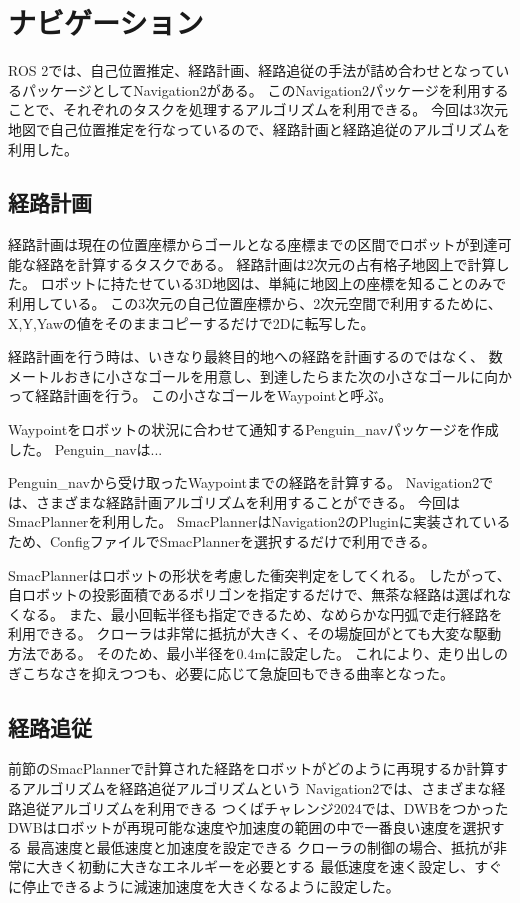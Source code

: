 \section{ナビゲーション}
ROS 2では、自己位置推定、経路計画、経路追従の手法が詰め合わせとなっているパッケージとしてNavigation2\cite{macenski2020marathon2}がある。
このNavigation2パッケージを利用することで、それぞれのタスクを処理するアルゴリズムを利用できる。
今回は3次元地図で自己位置推定を行なっているので、経路計画と経路追従のアルゴリズムを利用した。

\subsection{経路計画}
経路計画は現在の位置座標からゴールとなる座標までの区間でロボットが到達可能な経路を計算するタスクである。
経路計画は2次元の占有格子地図上で計算した。
ロボットに持たせている3D地図は、単純に地図上の座標を知ることのみで利用している。
この3次元の自己位置座標から、2次元空間で利用するために、X,Y,Yawの値をそのままコピーするだけで2Dに転写した。

経路計画を行う時は、いきなり最終目的地への経路を計画するのではなく、
数メートルおきに小さなゴールを用意し、到達したらまた次の小さなゴールに向かって経路計画を行う。
この小さなゴールをWaypointと呼ぶ。

Waypointをロボットの状況に合わせて通知するPenguin\_navパッケージ\cite{Penguin}を作成した。
Penguin\_navは...

Penguin\_navから受け取ったWaypointまでの経路を計算する。
Navigation2では、さまざまな経路計画アルゴリズムを利用することができる。
今回はSmacPlanner\cite{macenski2024smac}を利用した。
SmacPlannerはNavigation2のPluginに実装されているため、ConfigファイルでSmacPlannerを選択するだけで利用できる。

SmacPlannerはロボットの形状を考慮した衝突判定をしてくれる。
したがって、自ロボットの投影面積であるポリゴンを指定するだけで、無茶な経路は選ばれなくなる。
また、最小回転半径も指定できるため、なめらかな円弧で走行経路を利用できる。
クローラは非常に抵抗が大きく、その場旋回がとても大変な駆動方法である。
そのため、最小半径を0.4mに設定した。
これにより、走り出しのぎこちなさを抑えつつも、必要に応じて急旋回もできる曲率となった。

\subsection{経路追従}
前節のSmacPlannerで計算された経路をロボットがどのように再現するか計算するアルゴリズムを経路追従アルゴリズムという
Navigation2では、さまざまな経路追従アルゴリズムを利用できる
つくばチャレンジ2024では、DWBをつかった
DWBはロボットが再現可能な速度や加速度の範囲の中で一番良い速度を選択する
最高速度と最低速度と加速度を設定できる
クローラの制御の場合、抵抗が非常に大きく初動に大きなエネルギーを必要とする
最低速度を速く設定し、すぐに停止できるように減速加速度を大きくなるように設定した。